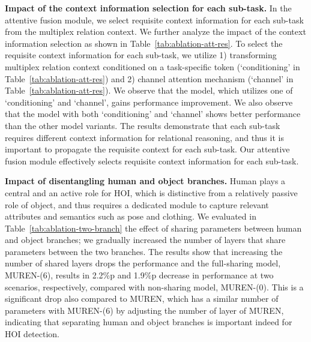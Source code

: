 \documentclass[10pt,twocolumn,letterpaper]{article}
\begin{document}
\noindent
\textbf{Impact of the context information selection for each sub-task.}
In the attentive fusion module, we select requisite context information for each sub-task from the multiplex relation context.
We further analyze the impact of the context information selection as shown in Table~\ref{tab:ablation-att-res}.
To select the requisite context information for each sub-task, we utilize 1) transforming
multiplex relation context conditioned on a task-specific token (`conditioning' in Table~\ref{tab:ablation-att-res}) and 2) channel attention mechanism (`channel' in Table~\ref{tab:ablation-att-res}).
We observe that the model, which utilizes one of `conditioning' and `channel', gains performance improvement.
We also observe that the model with both `conditioning' and `channel' shows better performance than the other model variants.
The results demonstrate that each sub-task requires different context information for relational reasoning, and thus it is important to propagate the requisite context for each sub-task.
Our attentive fusion module effectively selects requisite context information for each sub-task.


\noindent
\textbf{Impact of disentangling human and object branches.}
Human plays a central and an active role for HOI, which is distinctive from a relatively passive role of object, and thus requires a dedicated module to capture relevant attributes and semantics such as pose and clothing. 
We evaluated in Table~\ref{tab:ablation-two-branch}
the effect of sharing parameters between human and object branches; we gradually increased the number of layers that share parameters between the two branches.
The results show that increasing the number of shared layers drops the performance and the full-sharing model, MUREN-(6), results in 2.2\%p and 1.9\%p decrease in performance at two scenarios, respectively, compared with non-sharing model, MUREN-(0).
This is a significant drop also compared to MUREN, which has a similar number of parameters with MUREN-(6) by adjusting the number of layer  of MUREN, indicating that separating human and object branches is important indeed for HOI detection. 
\end{document}
